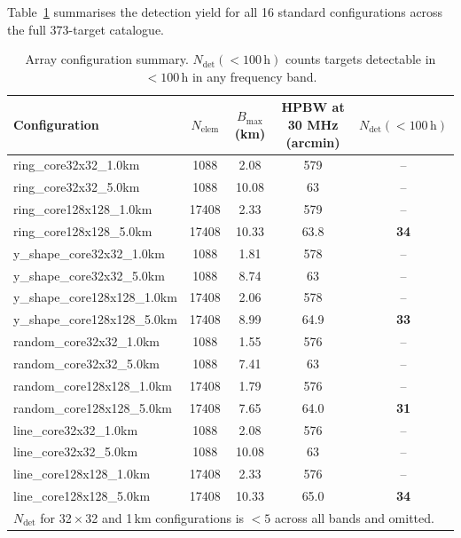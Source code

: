 \documentclass[12pt,a4paper]{article}
\begin{document}
Table~\ref{tab:main_results} summarises the detection yield for all 16
standard configurations across the full 373-target catalogue.

\begin{table}[H]
  \centering
  \caption{Array configuration summary.
    $N_\mathrm{det}(<100\,\mathrm{h})$ counts targets detectable in $<100$\,h
    in any frequency band.}
  \label{tab:main_results}
  \begin{tabular}{lcccc}
    \toprule
    Configuration & $N_\mathrm{elem}$ & $B_\mathrm{max}$ (km)
      & HPBW at 30 MHz (arcmin) & $N_\mathrm{det}(<100\,\mathrm{h})$ \\
    \midrule
    ring\_core32x32\_1.0km   &  1088 &  2.08 & 579 & -- \\
    ring\_core32x32\_5.0km   &  1088 & 10.08 &  63 & -- \\
    ring\_core128x128\_1.0km & 17408 &  2.33 & 579 & -- \\
    ring\_core128x128\_5.0km & 17408 & 10.33 & 63.8 & \textbf{34} \\
    y\_shape\_core32x32\_1.0km   &  1088 & 1.81 & 578 & -- \\
    y\_shape\_core32x32\_5.0km   &  1088 & 8.74 & 63 & -- \\
    y\_shape\_core128x128\_1.0km & 17408 & 2.06 & 578 & -- \\
    y\_shape\_core128x128\_5.0km & 17408 & 8.99 & 64.9 & \textbf{33} \\
    random\_core32x32\_1.0km   &  1088 & 1.55 & 576 & -- \\
    random\_core32x32\_5.0km   &  1088 & 7.41 & 63 & -- \\
    random\_core128x128\_1.0km & 17408 & 1.79 & 576 & -- \\
    random\_core128x128\_5.0km & 17408 & 7.65 & 64.0 & \textbf{31} \\
    line\_core32x32\_1.0km   &  1088 & 2.08 & 576 & -- \\
    line\_core32x32\_5.0km   &  1088 & 10.08 & 63 & -- \\
    line\_core128x128\_1.0km & 17408 & 2.33 & 576 & -- \\
    line\_core128x128\_5.0km & 17408 & 10.33 & 65.0 & \textbf{34} \\
    \bottomrule
    \multicolumn{5}{l}{\small $N_\mathrm{det}$ for 32\,$\times$\,32 and 1\,km
      configurations is $<5$ across all bands and omitted.} \\
  \end{tabular}
\end{table}
\end{document}
